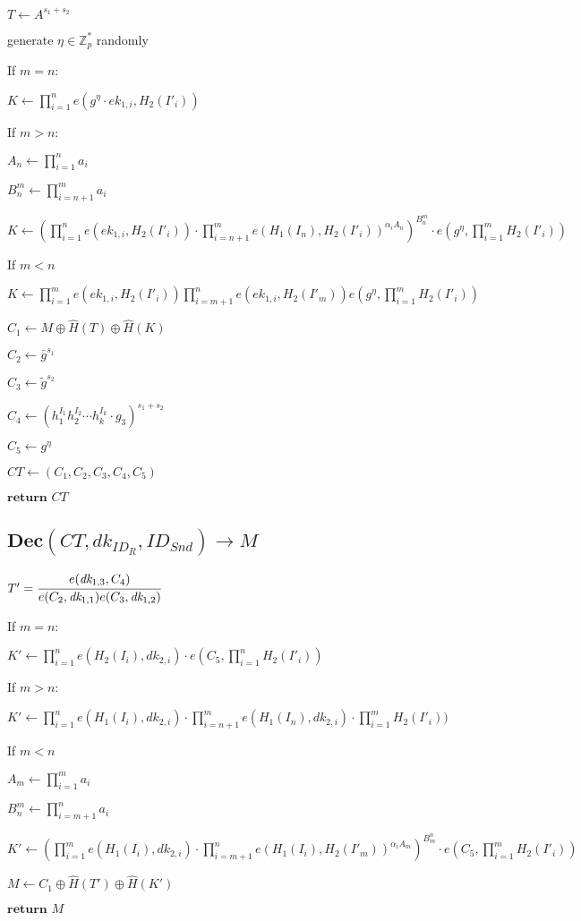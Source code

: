 \documentclass[a4paper]{article}
\begin{document}
$T \gets A^{s_1 + s_2}$

generate $\eta \in \mathbb{Z}_p^*$ randomly

If $m = n$:

$K \gets \prod_{i = 1}^n e(g^{\eta} \cdot \textit{ek}_{1, i}, H_2(I'_i))$

If $m > n$:

$A_n \gets \prod\limits_{i = 1}^n a_i$

$B_n^m \gets \prod\limits_{i = n + 1}^m a_i$

$K \gets
(
\prod\limits_{i = 1}^n e(\textit{ek}_{1, i}, H_2(I'_i))
\cdot \prod\limits_{i = n + 1}^m e(H_1(I_n), H_2(I'_i))^{\alpha_i A_n}
)^{B_n^m}
\cdot e(g^{\eta}, \prod\limits_{i = 1}^m H_2(I'_i))
$

If $m < n$

$K \gets
\prod\limits_{i = 1}^m e(\textit{ek}_{1, i}, H_2(I'_i))
\prod\limits_{i = m + 1}^n e(\textit{ek}_{1, i}, H_2(I'_m))
e(g^{\eta}, \prod\limits_{i = 1}^m H_2(I'_i))
$

$C_1 \gets M \oplus \hat{H}(T) \oplus \hat{H}(K)$

$C_2 \gets \bar{g}^{s_1}$

$C_3 \gets \tilde{g}^{s_2}$

$C_4 \gets (h_1^{I_1} h_2^{I_2} \cdots h_k^{I_k} \cdot g_3)^{s_1 + s_2}$

$C_5 \gets g^{\eta}$

$\textit{CT} \gets (C_1, C_2, C_3, C_4, C_5)$

$\textbf{return }\textit{CT}$

\subsection{$\textbf{Dec}(\textit{CT}, \textit{dk}_{\textit{ID}_R}, \textit{ID}_\textit{Snd}) \rightarrow M$}

$T' = \cfrac{e(\textit{dk}_{1, 3}, C_4)}{e(C_2, \textit{dk}_{1, 1})e(C_3, \textit{dk}_{1, 2})}$

If $m = n$:

$K' \gets
\prod\limits_{i = 1}^n e(H_2(I_i), \textit{dk}_{2, i})
\cdot e(C_5, \prod\limits_{i = 1}^n H_2(I'_i))
$

If $m > n$:

$K' \gets
\prod\limits_{i = 1}^n e(H_1(I_i), \textit{dk}_{2, i})
\cdot \prod\limits_{i = n + 1}^m e(H_1(I_n), \textit{dk}_{2, i})
\cdot \prod\limits_{i = 1}^m H_2(I'_i))
$

If $m < n$

$A_m \gets \prod\limits_{i = 1}^m a_i$

$B_n^m \gets \prod\limits_{i = m + 1}^n a_i$

$K' \gets
(
\prod\limits_{i = 1}^m e(H_1(I_i), \textit{dk}_{2, i})
\cdot \prod\limits_{i = m + 1}^n e(H_1(I_i), H_2(I'_m))^{\alpha_i A_m}
)^{B_m^n}
\cdot e(C_5, \prod\limits_{i = 1}^m H_2(I'_i))
$

$M \gets C_1 \oplus \hat{H}(T') \oplus \hat{H}(K')$

$\textbf{return }M$
\end{document}
